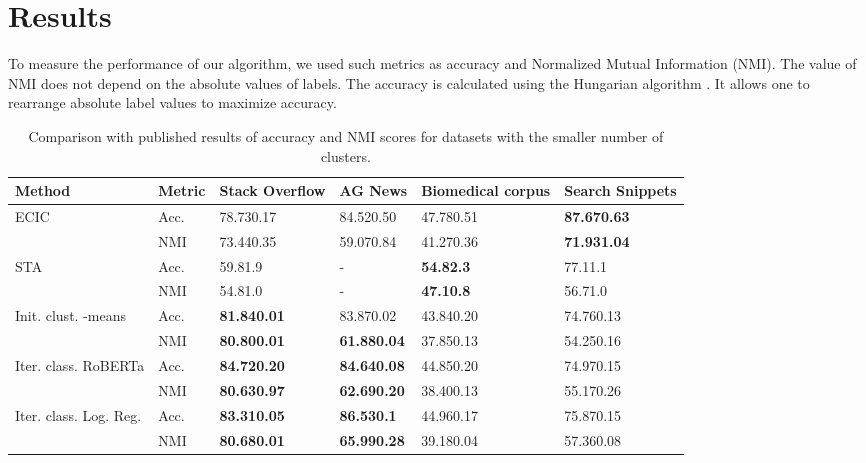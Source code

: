 \documentclass[11pt,a4paper]{article}
\begin{document}
\section{Results}
To measure the performance of our algorithm, we used such metrics as accuracy and Normalized Mutual Information (NMI). The value of NMI does not depend on the absolute values of labels. The accuracy is calculated using the Hungarian algorithm \cite{xu2017self}. It allows one to rearrange absolute label values to maximize accuracy.
\begin{table*}
\centering 
\begin{tabular}{llllll}
\hline
\textbf{Method} &  \textbf{Metric} & \textbf{Stack Overflow} & \textbf{AG News} & \textbf{Biomedical corpus} & \textbf{Search Snippets} \\
\hline
\multirow{2}{4em}{ECIC} & Acc. & 78.730.17 & 84.520.50 & 47.780.51 & \textbf{87.670.63} \\
& NMI &  73.440.35 & 59.070.84 & 41.270.36 & \textbf{71.931.04} \\
\hline
\multirow{2}{4em}{STA} & Acc. & 59.81.9 & - & \textbf{54.82.3} & 77.11.1 \\
& NMI & 54.81.0 & - & \textbf{47.10.8} & 56.71.0 \\
\hline
\multirow{2}{4em}{Init. clust.  -means} & Acc. & \textbf{81.840.01} &  83.870.02 & 43.840.20 & 74.760.13 \\
& NMI & \textbf{80.800.01} & \textbf{61.880.04} & 37.850.13 & 54.250.16 \\
\hline
\multirow{2}{4em}{Iter. class. RoBERTa} & Acc. & \textbf{84.720.20} & \textbf{84.640.08} & 44.850.20 & 74.970.15 \\
& NMI & \textbf{80.630.97} & \textbf{62.690.20} & 38.400.13 & 55.170.26 \\
\hline
\multirow{2}{4em}{Iter. class. Log. Reg.} & Acc. & \textbf{83.310.05} & \textbf{86.530.1} & 44.960.17 & 75.870.15 \\
& NMI & \textbf{80.680.01} & \textbf{65.990.28} & 39.180.04 & 57.360.08 \\
\hline
\end{tabular}
\caption{Comparison with published results of accuracy and NMI scores for datasets with the smaller number of clusters.} 
\label{sota1}
\end{table*}
\end{document}

